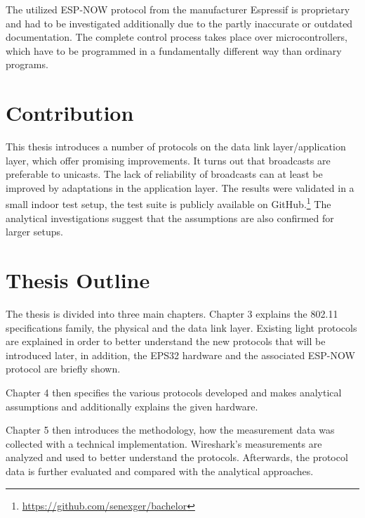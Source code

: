 The utilized ESP-NOW protocol from the manufacturer Espressif is proprietary
and had to be investigated additionally due to the partly inaccurate or outdated documentation.
The complete control process takes place over microcontrollers, 
which have to be programmed in a fundamentally different way than ordinary programs.

\section*{Contribution}

This thesis introduces a number of protocols on the data link layer/application layer,
which offer promising improvements.
It turns out that broadcasts are preferable to unicasts.
The lack of reliability of broadcasts can at least be improved by adaptations in the application layer.
The results were validated in a small indoor test setup,
the test suite is publicly available on GitHub.\footnote{\url{https://github.com/senexger/bachelor}}
The analytical investigations suggest that the assumptions are also confirmed for larger setups.

\section*{Thesis Outline}

The thesis is divided into three main chapters.
Chapter 3 explains the 802.11 specifications family, the physical and the data link layer.
Existing light protocols are explained in order to better understand the new protocols that will be introduced later,
in addition, the EPS32 hardware and the associated ESP-NOW protocol are briefly shown.

Chapter 4 then specifies the various protocols developed and makes analytical assumptions and
additionally explains the given hardware.

Chapter 5 then introduces the methodology, how the measurement data was collected with a technical implementation.
Wireshark's measurements are analyzed and used to better understand the protocols.
Afterwards, the protocol data is further evaluated and compared with the analytical approaches.